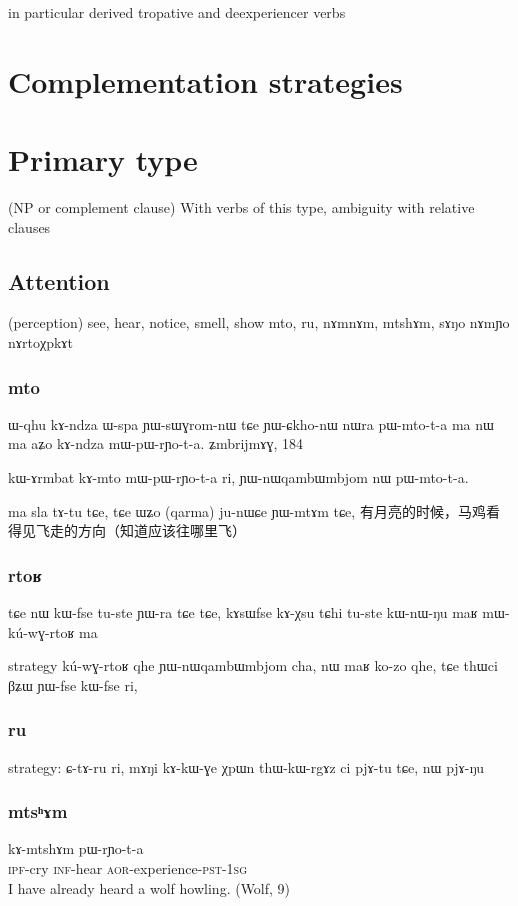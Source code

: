 \documentclass[oldfontcommands,oneside,a4paper,11pt]{article}
\newcommand{\ipa}[1]{{\phon #1}} %
\begin{document}
in particular derived tropative and deexperiencer verbs

 \section{Complementation strategies} 
\section{Primary type} 
(NP or complement clause)
 With verbs of this type, ambiguity with relative clauses
\subsection{Attention} 
 (perception)
 see, hear, notice, smell, show 
\ipa{mto}, \ipa{ru}, \ipa{nɤmnɤm}, \ipa{mtshɤm}, \ipa{sɤŋo} nɤmɲo nɤrtoχpkɤt

\subsubsection{mto}

ɯ-qhu kɤ-ndza ɯ-spa ɲɯ-sɯɣrom-nɯ tɕe ɲɯ-ɕkho-nɯ nɯra pɯ-mto-t-a ma
nɯ ma aʑo kɤ-ndza mɯ-pɯ-rɲo-t-a.
ʑmbrijmɤɣ, 184

kɯ-ɤrmbat kɤ-mto mɯ-pɯ-rɲo-t-a ri,
ɲɯ-nɯqambɯmbjom nɯ pɯ-mto-t-a.

ma sla tɤ-tu tɕe, tɕe ɯʑo (qarma) ju-nɯɕe ɲɯ-mtɤm tɕe, 
有月亮的时候，马鸡看得见飞走的方向（知道应该往哪里飞）

  \subsubsection{rtoʁ}
tɕe nɯ kɯ-fse tu-ste ɲɯ-ra tɕe tɕe,
kɤsɯfse kɤ-χsu tɕhi tu-ste kɯ-nɯ-ŋu maʁ mɯ-kú-wɣ-rtoʁ ma  
 
 
 strategy   	kú-wɣ-rtoʁ qhe ɲɯ-nɯqambɯmbjom cha,
nɯ maʁ ko-zo qhe, tɕe thɯci βʑɯ ɲɯ-fse kɯ-fse ri,

\subsubsection{ru}
strategy:
ɕ-tɤ-ru ri,
mɤŋi kɤ-kɯ-ɣe χpɯn thɯ-kɯ-rgɤz ci pjɤ-tu tɕe, nɯ pjɤ-ŋu




\subsubsection{mtsʰɤm}
		 \begin{exe}
\ex \label{ex:mtsham2}
 \gll   	\ipa{tu-ɣɤwu}    	\ipa{ kɤ-mtshɤm}   	\ipa{pɯ-rɲo-t-a}     	 \\
 \textsc{ipf}-cry   \textsc{inf}-hear \textsc{aor}-experience-\textsc{pst}-\textsc{1sg} \\
 \glt I have already heard a wolf howling. (Wolf, 9)
\end{exe} 
 		
\end{document}
